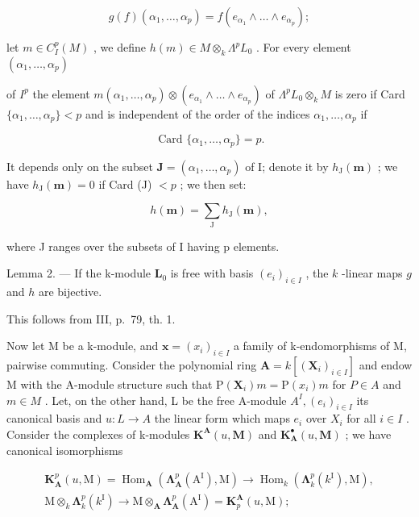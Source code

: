 \[
g (f) (\alpha_ {1}, \dots , \alpha_ {p}) = f (e _ {\alpha_ {1}} \wedge \dots \wedge e _ {\alpha_ {p}});
\]

let \(m \in C_{I}^{p}(M)\) , we define \(h(m) \in M \otimes_{k} \Lambda^{p} L_{0}\) . For every element \((\alpha_{1}, \ldots, \alpha_{p})\)

of \(I^{p}\) the element \(m(\alpha_{1},\ldots,\alpha_{p})\otimes(e_{\alpha_{1}}\wedge\ldots\wedge e_{\alpha_{p}})\) of \(\Lambda^{p}L_{0}\otimes_{k}M\) is zero if Card \(\{\alpha_{1},\ldots,\alpha_{p}\}<p\) and is independent of the order of the indices \(\alpha_{1},\ldots,\alpha_{p}\) if

\[
\text { Card } \{\alpha_ {1}, \dots , \alpha_ {p} \} = p.
\]

It depends only on the subset \(\mathbf{J} = (\alpha_{1},\ldots ,\alpha_{p})\) of I; denote it by \(h_\mathrm{J}(\pmb {m})\) ; we have \(h_\mathrm{J}(\pmb {m}) = 0\) if Card (J) \(< p\) ; we then set:

\[
h (\boldsymbol {m}) = \sum_ {\mathrm{J}} h _ {\mathrm{J}} (\boldsymbol {m}),
\]

where J ranges over the subsets of I having p elements.

Lemma 2. --- If the k-module \(\mathbf{L}_{0}\) is free with basis \((e_{i})_{i\in I}\) , the \(k\) -linear maps \(g\) and \(h\) are bijective.

This follows from III, p.~79, th. 1.

Now let M be a k-module, and \(\boldsymbol{x} = (x_{i})_{i \in I}\) a family of k-endomorphisms of M, pairwise commuting. Consider the polynomial ring \(\mathbf{A} = k[(\mathbf{X}_{i})_{i \in I}]\) and endow M with the A-module structure such that \(\mathrm{P}(\mathbf{X}_{i}) m = \mathrm{P}(x_{i}) m\) for \(P \in A\) and \(m \in M\) . Let, on the other hand, L be the free A-module \(A^{I}, (e_{i})_{i \in I}\) its canonical basis and \(u : L \to A\) the linear form which maps \(e_{i}\) over \(X_{i}\) for all \(i \in I\) . Consider the complexes of k-modules \(\mathbf{K}^{\mathbf{A}}(u, \mathbf{M})\) and \(\mathbf{K}_{\mathbf{A}}^{\bullet}(u, \mathbf{M})\) ; we have canonical isomorphisms

\[
\begin{array}{c} \mathbf {K} _ {\mathbf {A}} ^ {p} (u, \mathrm{M}) = \operatorname{Hom} _ {\mathbf {A}} \left(\boldsymbol {\Lambda} _ {\mathbf {A}} ^ {p} (\mathrm{A} ^ {\mathrm{I}}), \mathrm{M}\right) \to \operatorname{Hom} _ {k} \left(\boldsymbol {\Lambda} _ {k} ^ {p} (k ^ {\mathrm{I}}), \mathrm{M}\right), \\ \mathrm{M} \otimes_ {k} \boldsymbol {\Lambda} _ {k} ^ {p} (k ^ {\mathrm{I}}) \to \mathrm{M} \otimes_ {\mathbf {A}} \boldsymbol {\Lambda} _ {\mathbf {A}} ^ {p} (\mathrm{A} ^ {\mathrm{I}}) = \mathbf {K} _ {p} ^ {\mathbf {A}} (u, \mathrm{M}); \end{array}
\]


